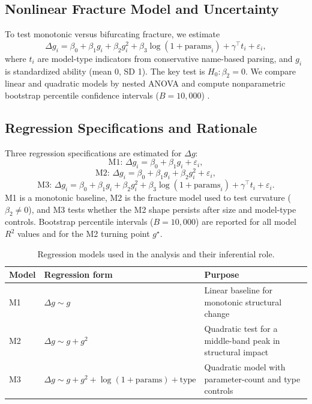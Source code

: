 \documentclass[11pt]{article}
\begin{document}
\subsection{Nonlinear Fracture Model and Uncertainty}
To test monotonic versus bifurcating fracture, we estimate
\[
\Delta g_i = \beta_0 + \beta_1 g_i + \beta_2 g_i^2 + \beta_3 \log(1+\mathrm{params}_i) + \gamma^\top t_i + \varepsilon_i,
\]
where $t_i$ are model-type indicators from conservative name-based parsing, and $g_i$ is standardized ability (mean 0, SD 1). The key test is $H_0:\beta_2=0$. We compare linear and quadratic models by nested ANOVA and compute nonparametric bootstrap percentile confidence intervals ($B=10{,}000$) \citep{efron1979bootstrap}.

\subsection{Regression Specifications and Rationale}
Three regression specifications are estimated for $\Delta g$:
\[
\text{M1: }\Delta g_i=\beta_0+\beta_1 g_i+\varepsilon_i,
\]
\[
\text{M2: }\Delta g_i=\beta_0+\beta_1 g_i+\beta_2 g_i^2+\varepsilon_i,
\]
\[
\text{M3: }\Delta g_i=\beta_0+\beta_1 g_i+\beta_2 g_i^2+\beta_3\log(1+\mathrm{params}_i)+\gamma^\top t_i+\varepsilon_i.
\]
M1 is a monotonic baseline, M2 is the fracture model used to test curvature ($\beta_2\neq 0$), and M3 tests whether the M2 shape persists after size and model-type controls. Bootstrap percentile intervals ($B=10{,}000$) are reported for all model $R^2$ values and for the M2 turning point $g^\star$.

\begin{table}[H]
\centering
\small
\begin{tabularx}{\textwidth}{@{}l>{\raggedright\arraybackslash}p{}Y@{}}
\toprule
Model & Regression form & Purpose \\
\midrule
M1 & $\Delta g\sim g$ & Linear baseline for monotonic structural change \\
M2 & $\Delta g\sim g+g^2$ & Quadratic test for a middle-band peak in structural impact \\
M3 & $\Delta g\sim g+g^2+\log(1+\mathrm{params})+\mathrm{type}$ & Quadratic model with parameter-count and type controls \\
\bottomrule
\end{tabularx}
\caption{Regression models used in the analysis and their inferential role.}
\label{tab:reg_models_method}
\end{table}
\end{document}
